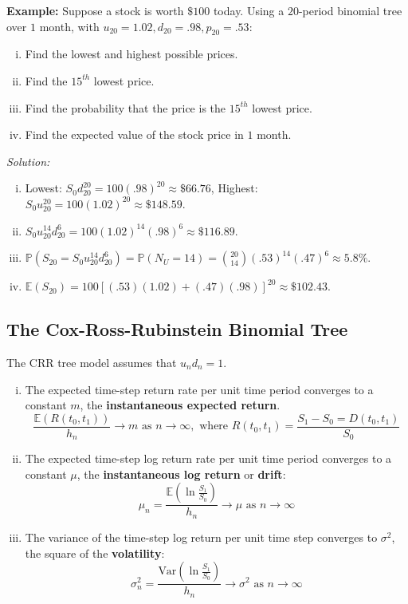 \textbf{Example: } Suppose a stock is worth \(\$100\) today. Using a \(20\)-period binomial tree over \(1\) month, with \(u_{20} = 1.02, d_{20} = .98, p_{20} = .53\):
\begin{enumerate}[i.]
    \item Find the lowest and highest possible prices.
    \item Find the \(15^{th}\) lowest price.
    \item Find the probability that the price is the \(15^{th}\) lowest price.
    \item Find the expected value of the stock price in \(1\) month.
\end{enumerate}
\textit{Solution: }
\begin{enumerate}[i.]
    \item Lowest: \(S_0d_{20}^{20} = 100(.98)^{20} \approx \$66.76\), Highest: \(S_0u_{20}^{20} = 100(1.02)^{20} \approx \$148.59\).

    \item \(S_0u_{20}^{14}d_{20}^{6} = 100(1.02)^{14}(.98)^{6} \approx \$116.89\).

    \item \(\mathbb{P}(S_{20} = S_0u_{20}^{14}d_{20}^6) = \mathbb{P}(N_U = 14) = {20 \choose 14}(.53)^{14}(.47)^6 \approx 5.8\%\).

    \item \(\mathbb{E}(S_{20}) = 100[(.53)(1.02) + (.47)(.98)]^{20} \approx \$102.43\).
\end{enumerate}

\subsection{The Cox-Ross-Rubinstein Binomial Tree}
The CRR tree model assumes that \(u_nd_n = 1\).
\begin{enumerate}[i.]
    \item The expected time-step return rate per unit time period converges to a constant \(m\), the \textbf{instantaneous expected return}.
    \begin{equation*}
        \frac{\mathbb{E}(R(t_0,t_1))}{h_n} \to m \text{ as } n \to \infty, \text{ where } R(t_0, t_1) = \frac{S_1 - S_0 = D(t_0, t_1)}{S_0}
    \end{equation*}

    \item The expected time-step log return rate per unit time period converges to a constant \(\mu\), the \textbf{instantaneous log return} or \textbf{drift}:
    \begin{equation*}
        \mu_n = \frac{\mathbb{E}(\ln \frac{S_1}{S_0})}{h_n} \to \mu \text{ as } n \to \infty
    \end{equation*}

    \item The variance of the time-step log return per unit time step converges to \(\sigma^2\), the square of the \textbf{volatility}:
    \begin{equation*}
        \sigma_n^2 = \frac{\text{Var}(\ln \frac{S_1}{S_0})}{h_n} \to \sigma^2 \text{ as } n \to \infty
    \end{equation*}
\end{enumerate}

